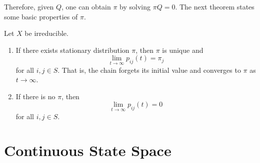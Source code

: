 \documentclass[11pt,twoside]{article}
\begin{document}
Therefore, given $Q$, one can obtain $\pi$ by solving $\pi Q = 0$. The next theorem states some basic properties of $\pi$.

\begin{theorem}
    Let $X$ be irreducible. 
    \begin{enumerate}
        \item If there exists stationary distribution $\pi$, then $\pi$ is unique and 
        \[
        \lim_{t \to \infty} p_{ij}(t) = \pi_j
        \]
        for all $i,j \in S$. That is, the chain forgets its initial value and converges to $\pi$ as $t \to \infty$.

        \item If there is no $\pi$, then
        \[
        \lim_{t \to \infty} p_{ij}(t) = 0
        \]
        for all $i,j \in S$.
    \end{enumerate}
\end{theorem}

\section{Continuous State Space}
\clearpage


\end{document}
